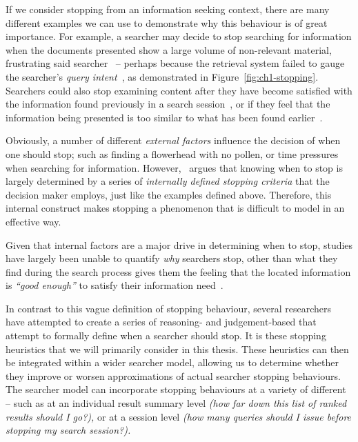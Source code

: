 If we consider stopping from an information seeking context, there are many different examples we can use to demonstrate why this behaviour is of great importance. For example, a searcher may decide to stop searching for information when the documents presented show a large volume of non-relevant material, frustrating said searcher~\citep{cooper1973retrieval_effectiveness_ii} -- perhaps because the retrieval system failed to gauge the searcher's \emph{query intent}~\citep{ashkan2009classifying}, as demonstrated in Figure~\ref{fig:ch1-stopping}. Searchers could also stop examining content after they have become satisfied with the information found previously in a search session~\citep{cooper1973retrieval_effectiveness, gibb1958number_rule, simon1955satiation}, or if they feel that the information being presented is too similar to what has been found earlier~\citep{nickles1995judgment}.

Obviously, a number of different \emph{external factors} influence the decision of when one should stop; such as finding a flowerhead with no pollen, or time pressures when searching for information. However,~\cite{nickles1995judgment} argues that knowing when to stop is largely determined by a series of \emph{internally defined stopping criteria} that the decision maker employs, just like the examples defined above. Therefore, this internal construct makes stopping a phenomenon that is difficult to model in an effective way.

Given that internal factors are a major drive in determining when to stop, studies have largely been unable to quantify \emph{why} searchers stop, other than what they find during the search process gives them the feeling that the located information is \emph{``good enough''} to satisfy their information need~\citep{zach2005enough_is_enough}.

In contrast to this vague definition of stopping behaviour, several researchers have attempted to create a series of reasoning- and judgement-based  that attempt to formally define when a searcher should stop. It is these stopping heuristics that we will primarily consider in this thesis. These heuristics can then be integrated within a wider searcher model, allowing us to determine whether they improve or worsen approximations of actual searcher stopping behaviours. The searcher model can incorporate stopping behaviours at a variety of different  -- such as at an individual result summary level \emph{(how far down this list of ranked results should I go?),} or at a session level \emph{(how many queries should I issue before stopping my search session?).}

